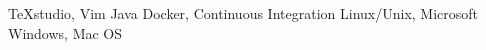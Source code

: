 
\makeheadline{\skills}

\begin{resume-twocol}
	\addskill{\software}
	{TeXstudio, Vim}
	\addskill{\programminglangs}
	{Java}
	\addskill{\technprinciples}
	{Docker, Continuous Integration}
	\addskill{\operatingsystems}
	{Linux/Unix, Microsoft Windows, Mac OS}
\end{resume-twocol}
